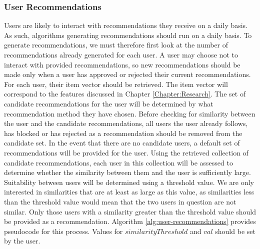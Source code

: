 \subsubsection{User Recommendations}
\label{sec:user-recommendations}
Users are likely to interact with recommendations they receive on a daily basis. As such, algorithms generating recommendations should run on a daily basis. To generate recommendations, we must therefore first look at the number of recommendations already generated for each user. A user may choose not to interact with provided recommendations, so new recommendations should be made only when a user has approved or rejected their current recommendations. For each user, their item vector should be retrieved. The item vector will correspond to the features discussed in Chapter \ref{Chapter:Research}. The set of candidate recommendations for the user will be determined by what recommendation method they have chosen. Before checking for similarity between the user and the candidate recommendations, all users the user already follows, has blocked or has rejected as a recommendation should be removed from the candidate set. In the event that there are no candidate users, a default set of recommendations will be provided for the user. Using the retrieved collection of candidate recommendations, each user in this collection will be assessed to determine whether the similarity between them and the user is sufficiently large. Suitability between users will be determined using a threshold value. We are only interested in similarities that are at least as large as this value, as similarities less than the threshold value would mean that the two users in question are not similar. Only those users with a similarity greater than the threshold value should be provided as a recommendation. Algorithm \ref{alg:user-recommendations} provides pseudocode for this process. Values for $similarityThreshold$ and $val$ should be set by the user.

